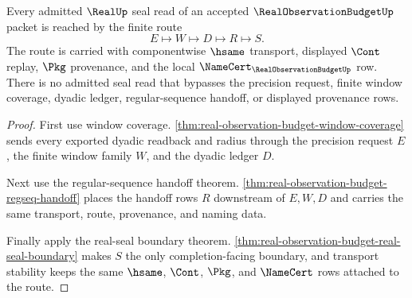 \begin{theorem}
\label{thm:real-observation-budget-finite-window-seal-route-totality}
Every admitted $\RealUp$ seal read of an accepted $\RealObservationBudgetUp$ packet is reached by the finite route
$$
E \longmapsto W \longmapsto D \longmapsto R \longmapsto S.
$$
The route is carried with componentwise $\hsame$ transport, displayed $\Cont$ replay, $\Pkg$ provenance, and the local $\NameCert_{\RealObservationBudgetUp}$ row. There is no admitted seal read that bypasses the precision request, finite window coverage, dyadic ledger, regular-sequence handoff, or displayed provenance rows.
\end{theorem}
\begin{proof}
First use window coverage. \autoref{thm:real-observation-budget-window-coverage} sends every exported dyadic readback and radius through the precision request $E$, the finite window family $W$, and the dyadic ledger $D$.

Next use the regular-sequence handoff theorem. \autoref{thm:real-observation-budget-regseq-handoff} places the handoff rows $R$ downstream of $E,W,D$ and carries the same transport, route, provenance, and naming data.

Finally apply the real-seal boundary theorem. \autoref{thm:real-observation-budget-real-seal-boundary} makes $S$ the only completion-facing boundary, and transport stability keeps the same $\hsame$, $\Cont$, $\Pkg$, and $\NameCert$ rows attached to the route.
\end{proof}

